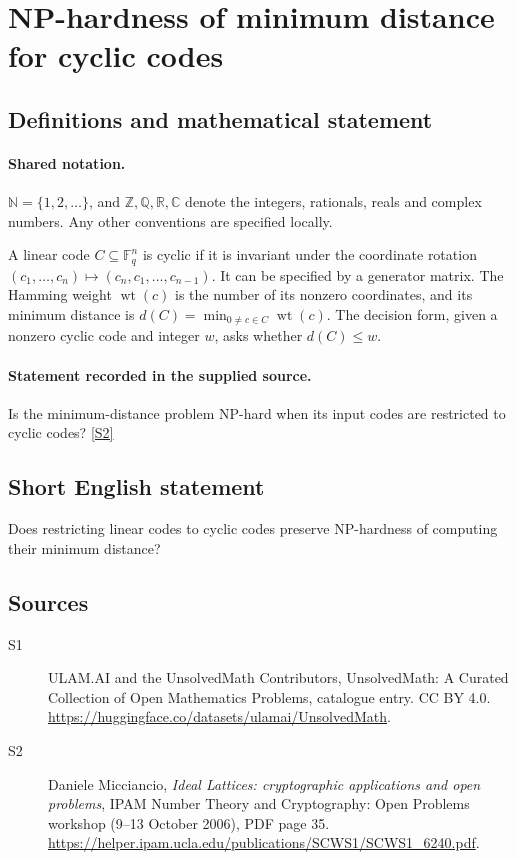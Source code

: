 \documentclass[11pt]{article}
\newcommand{\sref}[2]{\hyperlink{source:#1:#2}{[S#2]}}
\begin{document}
\section{NP-hardness of minimum distance for cyclic codes}\label{statement}

\subsection{Definitions and mathematical statement}

\paragraph{Shared notation.}$\mathbb N=\{1,2,\ldots\}$, and $\mathbb Z,\mathbb Q,\mathbb R,\mathbb C$ denote the integers, rationals, reals and complex numbers. Any other conventions are specified locally.


A linear code $C\subseteq\mathbb F_q^n$ is cyclic if it is invariant under the coordinate rotation $(c_1,\ldots,c_n)\mapsto(c_n,c_1,\ldots,c_{n-1})$. It can be specified by a generator matrix. The Hamming weight $\operatorname{wt}(c)$ is the number of its nonzero coordinates, and its minimum distance is $d(C)=\min_{0\ne c\in C}\operatorname{wt}(c)$. The decision form, given a nonzero cyclic code and integer $w$, asks whether $d(C)\le w$.
\paragraph{Statement recorded in the supplied source.}
Is the minimum-distance problem NP-hard when its input codes are restricted to cyclic codes? \sref{statement}{2}

\subsection{Short English statement}
Does restricting linear codes to cyclic codes preserve NP-hardness of computing their minimum distance?
\subsection{Sources}
\begin{description}
\item[\hypertarget{source:statement:1}{S1}] ULAM.AI and the UnsolvedMath Contributors, UnsolvedMath: A Curated Collection of Open Mathematics Problems, catalogue entry. CC BY 4.0. \url{https://huggingface.co/datasets/ulamai/UnsolvedMath}.
\item[\hypertarget{source:statement:2}{S2}] Daniele Micciancio, \emph{Ideal Lattices: cryptographic applications and open problems}, IPAM Number Theory and Cryptography: Open Problems workshop (9--13 October 2006), PDF page 35. \url{https://helper.ipam.ucla.edu/publications/SCWS1/SCWS1_6240.pdf}.
\end{description}
\label{end:statement}
\end{document}
